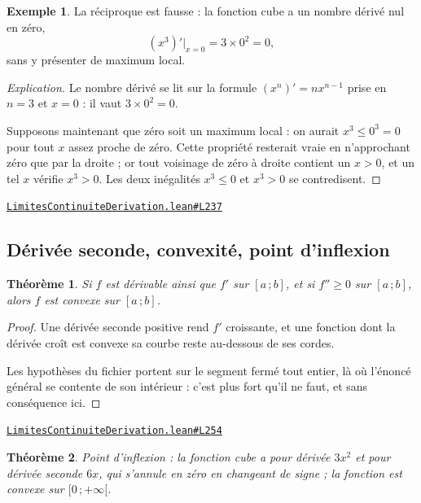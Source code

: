 \documentclass[11pt,a4paper]{article}
\theoremstyle{definition}
\newtheorem{exemple}{Exemple}
\theoremstyle{plain}
\newtheorem{theoreme}{Théorème}
\newenvironment{explication}{\begin{proof}[Explication]}{\end{proof}}
\newcommand{\source}[2]{\par\smallskip\noindent\hfill{\footnotesize\href{#1}{\texttt{#2}}}\par\smallskip}
\begin{document}
\begin{exemple}
La réciproque est fausse : la fonction cube a un nombre dérivé nul en zéro,
\[ (x^{3})'\big|_{x=0} = 3 \times 0^{2} = 0 , \]
sans y présenter de maximum local.
\end{exemple}

\begin{explication}
Le nombre dérivé se lit sur la formule $(x^n)' = n x^{n-1}$ prise en $n = 3$ et $x = 0$ :
il vaut $3 \times 0^{2} = 0$.

Supposons maintenant que zéro soit un maximum local : on aurait $x^{3} \le 0^{3} = 0$ pour
tout $x$ assez proche de zéro. Cette propriété resterait vraie en n'approchant zéro que par
la droite ; or tout voisinage de zéro à droite contient un $x > 0$, et un tel $x$ vérifie
$x^{3} > 0$. Les deux inégalités $x^3 \le 0$ et $x^3 > 0$ se contredisent.
\end{explication}
\source{https://github.com/Commutator-IO/learn-lean/blob/main/courses/02-lycee/04-limites-continuite-derivation/LimitesContinuiteDerivation.lean\#L237}{LimitesContinuiteDerivation.lean\#L237}

\subsection{Dérivée seconde, convexité, point d'inflexion}

\begin{theoreme}
Si $f$ est dérivable ainsi que $f'$ sur $[a\,;b]$, et si $f'' \ge 0$ sur $[a\,;b]$, alors
$f$ est convexe sur $[a\,;b]$.
\end{theoreme}

\begin{proof}
Une dérivée seconde positive rend $f'$ croissante, et une fonction dont la dérivée croît
est convexe \textemdash{} sa courbe reste au-dessous de ses cordes.

Les hypothèses du fichier portent sur le segment fermé tout entier, là où l'énoncé général
se contente de son intérieur : c'est plus fort qu'il ne faut, et sans conséquence ici.
\end{proof}
\source{https://github.com/Commutator-IO/learn-lean/blob/main/courses/02-lycee/04-limites-continuite-derivation/LimitesContinuiteDerivation.lean\#L254}{LimitesContinuiteDerivation.lean\#L254}

\begin{theoreme}
Point d'inflexion : la fonction cube a pour dérivée $3x^{2}$ et pour dérivée seconde
$6x$, qui s'annule en zéro en changeant de signe ; la fonction est convexe sur
$[0\,;+\infty[$.
\end{theoreme}
\end{document}
